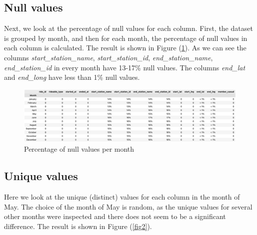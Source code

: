 \documentclass[12pt]{article}
\begin{document}
\subsection{Null values}
Next, we look at the percentage of null values for each column. First, the dataset is grouped by month, and then for each month, the percentage of null values in each column is calculated. The result is shown in Figure (\underline{\ref{fig4}}). As we can see the columns \textit{start\_station\_name}, \textit{start\_station\_id}, \textit{end\_station\_name}, \textit{end\_station\_id} in every month have 13-17\% null values. The columns \textit{end\_lat} and \textit{end\_long} have less than 1\% null values. \\
	
	\begin{figure}[h]
	\centering
	\includegraphics[scale=0.43]{null_percents.png}
	\caption{Percentage of null values per month}
	\label{fig4}
	\end{figure}
	
\subsection{Unique values}
Here we look at the unique (distinct) values for each column in the month of May. The choice of the month of May is random, as the unique values for several other months were inspected and there does not seem to be a significant difference. The result is shown in Figure (\ref{fig2}). 
	
\end{document}

